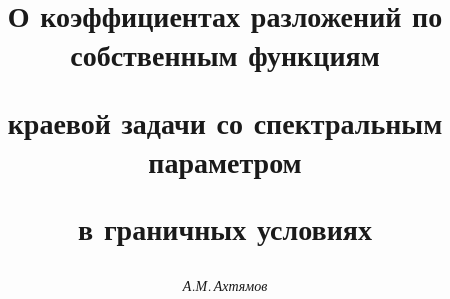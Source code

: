 

 




 


\newcommand{\la}{\langle} 


\newcommand{\ra}{\rangle} 


\newcommand{\tts}[1]{} 


\renewcommand{\baselinestretch}{1.05}


 




 


\setcounter{page}{13} 












 


\author{\it А.М.\,Ахтямов} 




\title{О коэффициентах разложений по собственным функциям  


краевой задачи со спектральным параметром  


в граничных условиях} 


 


\date{} 




\pagestyle{plain} %


